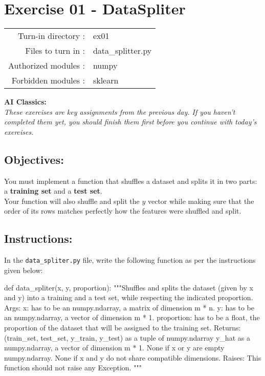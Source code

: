 \documentclass[]{article}
\newenvironment{Shaded}{\begin{snugshade}}{\end{snugshade}}
\newcommand{\CommentTok}[1]{\textcolor[rgb]{0.48,0.49,0.49}{#1}}
\newcommand{\KeywordTok}[1]{\textcolor[rgb]{0.81,0.81,0.76}{#1}}
\newcommand{\NormalTok}[1]{\textcolor[rgb]{0.81,0.81,0.76}{#1}}
\begin{document}
\clearpage

\hypertarget{exercise-01---dataspliter}{%
\section{Exercise 01 - DataSpliter}\label{exercise-01---dataspliter}}

\begin{longtable}[]{@{}rl@{}}
\toprule
\endhead
Turn-in directory : & ex01\tabularnewline
Files to turn in : & data\_splitter.py\tabularnewline
Authorized modules : & numpy\tabularnewline
Forbidden modules : & sklearn\tabularnewline
\bottomrule
\end{longtable}

\textbf{AI Classics:}\\
\emph{These exercises are key assignments from the previous day. If you
haven't completed them yet, you should finish them first before you
continue with today's exercises.}

\hypertarget{objectives-1}{%
\subsection{Objectives:}\label{objectives-1}}

You must implement a function that shuffles a dataset and splits it in
two parts: a \textbf{training set} and a \textbf{test set}.\\
Your function will also shuffle and split the \(y\) vector while making
sure that the order of its rows matches perfectly how the features were
shuffled and split.

\hypertarget{instructions-1}{%
\subsection{Instructions:}\label{instructions-1}}

In the \texttt{data\_spliter.py} file, write the following function as
per the instructions given below:

\begin{Shaded}
\begin{Highlighting}[]
\KeywordTok{def}\NormalTok{ data_spliter(x, y, proportion):}
    \CommentTok{"""Shuffles and splits the dataset (given by x and y) into a training and a test set, while respecting the indicated proportion.}
\CommentTok{    Args:}
\CommentTok{      x: has to be an numpy.ndarray, a matrix of dimension m * n.}
\CommentTok{      y: has to be an numpy.ndarray, a vector of dimension m * 1.}
\CommentTok{      proportion: has to be a float, the proportion of the dataset that will be assigned to the training set.}
\CommentTok{    Returns:}
\CommentTok{      (train_set, test_set, y_train, y_test) as a tuple of numpy.ndarray}
\CommentTok{      y_hat as a numpy.ndarray, a vector of dimension m * 1.}
\CommentTok{      None if x or y are empty numpy.ndarray.}
\CommentTok{      None if x and y do not share compatible dimensions.}
\CommentTok{    Raises:}
\CommentTok{      This function should not raise any Exception.}
\CommentTok{    """}
\end{Highlighting}
\end{Shaded}
\end{document}
